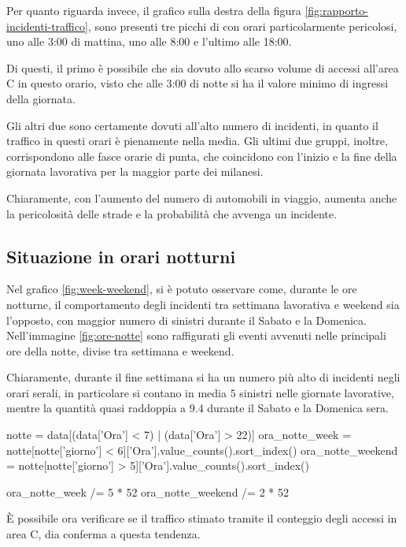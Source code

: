 \documentclass[a4paper]{report}
\begin{document}
Per quanto riguarda invece, il grafico sulla destra della 
figura \ref{fig:rapporto-incidenti-traffico}, sono presenti tre picchi di 
con orari particolarmente pericolosi, uno alle 3:00 di mattina, uno alle 
8:00 e l'ultimo alle 18:00. 

Di questi, il primo è possibile che sia dovuto allo scarso volume di accessi 
all'area C in questo orario, visto che alle 3:00 di notte si ha il valore minimo di 
ingressi della giornata. 

Gli altri due sono certamente dovuti all'alto 
numero di incidenti, in quanto il traffico in questi orari è pienamente nella media. 
Gli ultimi due gruppi, inoltre, corrispondono alle fasce orarie di punta, che coincidono 
con l'inizio e la fine della giornata lavorativa per la maggior parte dei milanesi. 

Chiaramente, con l'aumento del numero di automobili in viaggio, aumenta anche 
la pericolosità delle strade e la probabilità che avvenga un incidente. 

\subsection{Situazione in orari notturni}

Nel grafico \ref{fig:week-weekend}, si è potuto osservare come, durante le 
ore notturne, il comportamento degli incidenti tra settimana lavorativa e weekend 
sia l'opposto, con maggior numero di sinistri durante il 
Sabato e la Domenica. 
Nell'immagine \ref{fig:ore-notte} sono raffigurati gli eventi avvenuti 
nelle principali ore della notte, divise tra settimana e weekend. 

Chiaramente, durante il fine settimana si ha un numero 
più alto di incidenti negli orari serali, 
in particolare si contano in media $5$ sinistri nelle giornate lavorative, 
mentre la quantità quasi raddoppia a $9.4$ durante il Sabato e la Domenica sera. 

\begin{code}
notte = data[(data['Ora'] < 7) | (data['Ora'] > 22)]
ora_notte_week = notte[notte['giorno'] < 6]['Ora'].value_counts().sort_index()
ora_notte_weekend = notte[notte['giorno'] > 5]['Ora'].value_counts().sort_index()

ora_notte_week /= 5 * 52  
ora_notte_weekend /= 2 * 52
\end{code}

\`E possibile ora verificare se il traffico stimato tramite il conteggio degli 
accessi in area C, dia conferma a questa tendenza.
\end{document}
